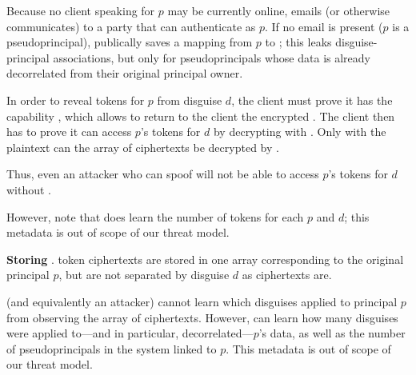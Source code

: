 Because no client speaking for $p$ may be currently online, \sys emails (or otherwise communicates)
 to a party that can authenticate as $p$. If no email is present (\eg $p$ is a pseudoprincipal),
\sys publically saves a mapping from $p$ to ; this leaks disguise-principal associations, but
only for pseudoprincipals whose data is already decorrelated from their original principal owner.

In order to reveal tokens for $p$ from disguise $d$, the client must prove it has the capability
,
which allows \sys to return to the client the encrypted . The client then has to prove it
can access $p$'s tokens for $d$ by decrypting  with .  Only with the plaintext
 can the array of  ciphertexts be decrypted by \sys.

Thus, even an attacker who can spoof  will not be able to access $p$'s tokens for $d$ without
.

However, note that \sys does learn the number of  tokens for each $p$ and $d$; this
metadata is out of scope of our threat model.

\vspace{6pt}\noindent\textbf{Storing }.
 token ciphertexts are stored in one array corresponding to the original principal $p$, but are not
separated by disguise $d$ as  ciphertexts are.

\sys (and equivalently an attacker) cannot learn which disguises applied to principal $p$ from
observing the array of  ciphertexts. However, \sys can learn how many disguises were
applied to---and in particular, decorrelated---$p$'s data, as well as the number of pseudoprincipals
in the system linked to $p$. This metadata is out of scope of our threat model.



